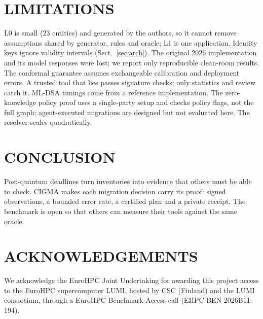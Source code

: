 \documentclass[a4paper,twoside]{article}
\newcommand{\cigma}{CIGMA\xspace}
\begin{document}
\section{\uppercase{Limitations}}
\label{sec:limits}
L0 is small (23 entities) and generated by the authors, so it cannot remove assumptions shared by generator, rules and oracle; L1 is one application. Identity keys ignore validity intervals (Sect.~\ref{sec:arch}). The original 2026 implementation and its model responses were lost; we report only reproducible clean-room results. The conformal guarantee assumes exchangeable calibration and deployment errors. A trusted tool that lies passes signature checks; only statistics and review catch it. ML-DSA timings come from a reference implementation. The zero-knowledge policy proof uses a single-party setup and checks policy flags, not the full graph; agent-executed migrations are designed but not evaluated here. The resolver scales quadratically.

\section{\uppercase{Conclusion}}
\label{sec:conclusion}
Post-quantum deadlines turn inventories into evidence that others must be able to check. \cigma makes each migration decision carry its proof: signed observations, a bounded error rate, a certified plan and a private receipt. The benchmark is open so that others can measure their tools against the same oracle.

\section*{\uppercase{Acknowledgements}}
\noindent We acknowledge the EuroHPC Joint Undertaking for awarding this project access to the EuroHPC supercomputer LUMI, hosted by CSC (Finland) and the LUMI consortium, through a EuroHPC Benchmark Access call (EHPC-BEN-2026B11-194).


{\small }
\end{document}
